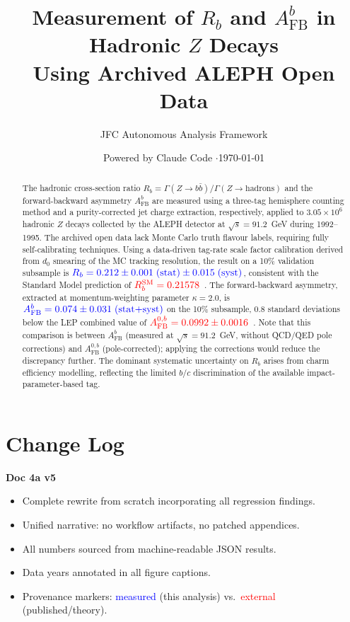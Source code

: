 \documentclass[11pt,a4paper]{article}
\title{Measurement of $R_b$ and $A_\text{FB}^b$ in Hadronic $Z$ Decays\\
Using Archived ALEPH Open Data}
\author{JFC Autonomous Analysis Framework}
\date{Powered by Claude Code \quad$\cdot$\quad \today}
\newcommand{\measured}[1]{\textcolor{blue}{#1}}
\newcommand{\external}[1]{\textcolor{red}{#1}}
\begin{document}
\maketitle

\begin{abstract}
The hadronic cross-section ratio
$R_b = \Gamma(Z \to b\bar{b}) / \Gamma(Z \to \text{hadrons})$
and the forward-backward asymmetry $A_\text{FB}^b$ are measured using
a three-tag hemisphere counting method and a purity-corrected jet
charge extraction, respectively, applied to $3.05 \times 10^6$
hadronic $Z$ decays collected by the ALEPH detector at
$\sqrt{s} = 91.2$~GeV during 1992--1995.
The archived open data lack Monte Carlo truth flavour labels,
requiring fully self-calibrating techniques.
Using a data-driven tag-rate scale factor calibration derived from
$d_0$ smearing of the MC tracking resolution, the result on a 10\%
validation subsample is
$\measured{R_b = 0.212 \pm 0.001\;\text{(stat)} \pm 0.015\;\text{(syst)}}$,
consistent with the Standard Model prediction of
$\external{R_b^\text{SM} = 0.21578}$~\cite{LEP:EWWG:2005}.
The forward-backward asymmetry, extracted at momentum-weighting
parameter $\kappa = 2.0$, is
$\measured{A_\text{FB}^b = 0.074 \pm 0.031\;\text{(stat+syst)}}$
on the 10\% subsample, $0.8$ standard deviations below the
LEP combined value of
$\external{A_\text{FB}^{0,b} = 0.0992 \pm 0.0016}$~\cite{LEP:EWWG:2005}.
Note that this comparison is between $A_\text{FB}^b$ (measured at $\sqrt{s} = 91.2$~GeV,
without QCD/QED pole corrections) and $A_\text{FB}^{0,b}$ (pole-corrected);
applying the corrections would reduce the discrepancy further.
The dominant systematic uncertainty on $R_b$ arises from charm
efficiency modelling, reflecting the limited $b$/$c$ discrimination
of the available impact-parameter-based tag.
\end{abstract}

\tableofcontents
\clearpage

\section*{Change Log}

\textbf{Doc 4a v5}
\begin{itemize}
\item Complete rewrite from scratch incorporating all regression findings.
\item Unified narrative: no workflow artifacts, no patched appendices.
\item All numbers sourced from machine-readable JSON results.
\item Data years annotated in all figure captions.
\item Provenance markers: \measured{measured} (this analysis) vs.\ \external{external} (published/theory).
\end{itemize}
\end{document}

